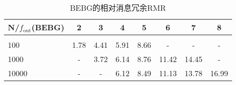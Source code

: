 \begin{table}[htbp]
    \centering
    \caption{BEBG的相对消息冗余RMR}
    \begin{tabular}{lccccccc}
		\toprule
        N/$f_\text{out}$(BEBG) & 2 & 3 & 4 & 5 &6 &7 & 8 \\[1pt]
        \midrule
        \\[-15pt]
        100         & 1.78         & 4.41         & 5.91         & 8.66          & -             & -           & -        \\
        1000        & -            & 3.72         & 6.14         & 8.76          & 11.42         & 14.45       & -        \\
        10000       & -            & -            & 6.12         & 8.49          & 11.13         & 13.78       & 16.99    \\
    \bottomrule
    \end{tabular}
    \label{table:3-dup_BEBG}
\end{table}